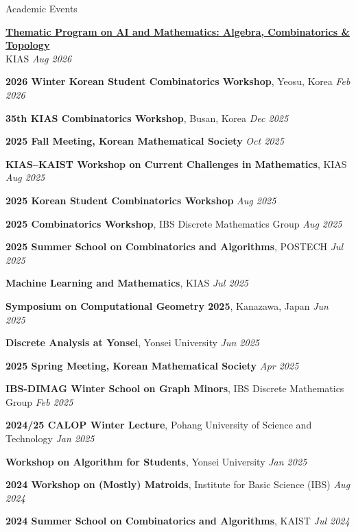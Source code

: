 \documentclass{resume}
\begin{document}
\begin{rSection}{Academic Events}

\textbf{\href{https://symposia.kias.re.kr/AI-Math2026/page/ai-math-act-2026}{Thematic Program on AI and Mathematics: Algebra, Combinatorics \& Topology}}\\
KIAS \hfill \textit{Aug 2026}

\textbf{2026 Winter Korean Student Combinatorics Workshop}, Yeosu, Korea \hfill \textit{Feb 2026}

\textbf{35th KIAS Combinatorics Workshop}, Busan, Korea \hfill \textit{Dec 2025}

\textbf{2025 Fall Meeting, Korean Mathematical Society} \hfill \textit{Oct 2025}

\textbf{KIAS--KAIST Workshop on Current Challenges in Mathematics}, KIAS \hfill \textit{Aug 2025}

\textbf{2025 Korean Student Combinatorics Workshop} \hfill \textit{Aug 2025}

\textbf{2025 Combinatorics Workshop}, IBS Discrete Mathematics Group \hfill \textit{Aug 2025}

\textbf{2025 Summer School on Combinatorics and Algorithms}, POSTECH \hfill \textit{Jul 2025}

\textbf{Machine Learning and Mathematics}, KIAS \hfill \textit{Jul 2025}

\textbf{Symposium on Computational Geometry 2025}, Kanazawa, Japan \hfill \textit{Jun 2025}

\textbf{Discrete Analysis at Yonsei}, Yonsei University \hfill \textit{Jun 2025}

\textbf{2025 Spring Meeting, Korean Mathematical Society} \hfill \textit{Apr 2025}

\textbf{IBS-DIMAG Winter School on Graph Minors}, IBS Discrete Mathematics Group \hfill \textit{Feb 2025}

\textbf{2024/25 CALOP Winter Lecture}, Pohang University of Science and Technology \hfill \textit{Jan 2025}

\textbf{Workshop on Algorithm for Students}, Yonsei University \hfill \textit{Jan 2025}

\textbf{2024 Workshop on (Mostly) Matroids}, Institute for Basic Science (IBS) \hfill \textit{Aug 2024}

\textbf{2024 Summer School on Combinatorics and Algorithms}, KAIST \hfill \textit{Jul 2024}

\end{rSection}
\end{document}
